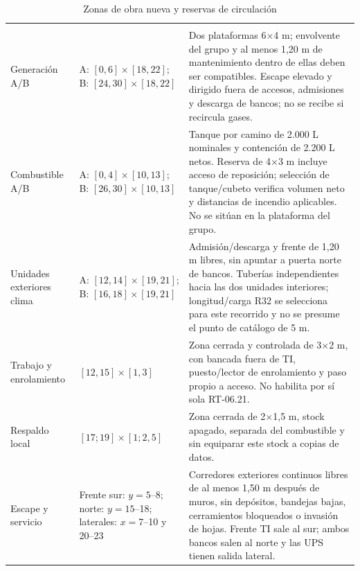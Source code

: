 \begin{longtable}{L{\dimexpr.23\tabcolsep\relax}L{\dimexpr.30\tabcolsep\relax}L{\dimexpr.47\tabcolsep\relax}}
\caption{Zonas de obra nueva y reservas de circulación}\label{tab:recinto-coordenadas}\\\hline
{} &  & \\\hline
\endfirsthead
\hline{} &  & \\\hline\endhead
Generación A/B & A: $[0,6]\times[18,22]$; B: $[24,30]\times[18,22]$ & Dos plataformas 6$\times$4 m; envolvente del grupo y al menos 1,20 m de mantenimiento dentro de ellas deben ser compatibles. Escape elevado y dirigido fuera de accesos, admisiones y descarga de bancos; no se recibe si recircula gases.\\\hline
Combustible A/B & A: $[0,4]\times[10,13]$; B: $[26,30]\times[10,13]$ & Tanque por camino de 2.000 L nominales y contención de 2.200 L netos. Reserva de 4$\times$3 m incluye acceso de reposición; selección de tanque/cubeto verifica volumen neto y distancias de incendio aplicables. No se sitúan en la plataforma del grupo.\\\hline
Unidades exteriores clima & A: $[12,14]\times[19,21]$; B: $[16,18]\times[19,21]$ & Admisión/descarga y frente de 1,20 m libres, sin apuntar a puerta norte de bancos. Tuberías independientes hacia las dos unidades interiores; longitud/carga R32 se selecciona para este recorrido y no se presume el punto de catálogo de 5 m.\\\hline
Trabajo y enrolamiento & $[12,15]\times[1,3]$ & Zona cerrada y controlada de 3$\times$2 m, con bancada fuera de TI, puesto/lector de enrolamiento y paso propio a acceso. No habilita por sí sola RT-06.21.\\\hline
Respaldo local & $[17;19]\times[1;2{,}5]$ & Zona cerrada de 2$\times$1,5 m, stock apagado, separada del combustible y sin equiparar este stock a copias de datos.\\\hline
Escape y servicio & Frente sur: $y=5$--8; norte: $y=15$--18; laterales: $x=7$--10 y 20--23 & Corredores exteriores continuos libres de al menos 1,50 m después de muros, sin depósitos, bandejas bajas, cerramientos bloqueados o invasión de hojas. Frente TI sale al sur; ambos bancos salen al norte y las UPS tienen salida lateral.\\\hline
\end{longtable}

